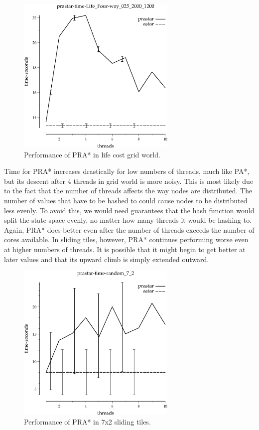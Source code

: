 \documentclass{article}
\begin{document}
\begin{figure}[h!]
\includegraphics[width=3in]{../graphs/seth/grid-life-single/PRAStar.eps}
\caption{Performance of PRA* in life cost grid world.}
\label{fig:PRAStar-life}
\end{figure}

Time for PRA* increases drastically for low numbers of threads, much like PA*, but its descent after 4 threads in grid world is more noisy. This is most likely due to the fact that the number of threads affects the way nodes are distributed. The number of values that have to be hashed to could cause nodes to be distributed less evenly. To avoid this, we would need guarantees that the hash function would split the state space evenly, no matter how many threads it would be hashing to. Again, PRA* does better even after the number of threads exceeds the number of cores available. In sliding tiles, however, PRA* continues performing worse even at higher numbers of threads. It is possible that it might begin to get better at later values and that its upward climb is simply extended outward.

\begin{figure}[h!]
\includegraphics[width=3in]{../graphs/seth/tiles-single/PRAStar.eps}
\caption{Performance of PRA* in 7x2 sliding tiles.}
\label{fig:PRAStar-life}
\end{figure}
\end{document}
